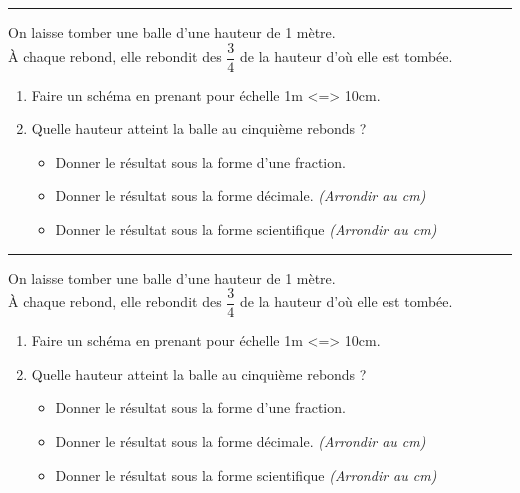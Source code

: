 \documentclass[11pt]{article}
\newcommand{\horrule}[1]{\rule{\linewidth}{#1}} %
\begin{document}
\horrule{1px}
\vspace{0.3cm}

On laisse tomber une balle d'une hauteur de 1 mètre.\\
À chaque rebond, elle rebondit des $\dfrac{3}{4}$ de la hauteur d'où elle est tombée.\\
\begin{enumerate}
\item Faire un schéma en prenant pour échelle 1m <=> 10cm.
\item Quelle hauteur atteint la balle au cinquième rebonds ?
  \begin{itemize}
  \item Donner le résultat sous la forme d'une fraction.
  \item Donner le résultat sous la forme décimale. \textit{(Arrondir au cm)}
  \item Donner le résultat sous la forme scientifique \textit{(Arrondir au cm)}
  \end{itemize}
\end{enumerate}

\horrule{1px}
\vspace{0.3cm}

On laisse tomber une balle d'une hauteur de 1 mètre.\\
À chaque rebond, elle rebondit des $\dfrac{3}{4}$ de la hauteur d'où elle est tombée.\\
\begin{enumerate}
\item Faire un schéma en prenant pour échelle 1m <=> 10cm.
\item Quelle hauteur atteint la balle au cinquième rebonds ?
  \begin{itemize}
  \item Donner le résultat sous la forme d'une fraction.
  \item Donner le résultat sous la forme décimale. \textit{(Arrondir au cm)}
  \item Donner le résultat sous la forme scientifique \textit{(Arrondir au cm)}
  \end{itemize}
\end{enumerate}
\end{document}
